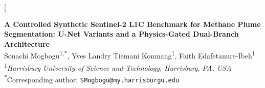 \documentclass[10pt,twocolumn]{article}
\newcommand{\papertitle}{A Controlled Synthetic Sentinel-2 L1C Benchmark for Methane Plume Segmentation: U-Net Variants and a Physics-Gated Dual-Branch Architecture}
\begin{document}
\twocolumn[
\begin{center}
{\LARGE\bfseries \papertitle}\\
\vspace{10pt}
{\large Sonachi Mogbogu\textsuperscript{1,*},\quad
Yves Landry Tiemani Komnang\textsuperscript{1},\quad
Faith Edafetanure-Ibeh\textsuperscript{1}}\\
\vspace{4pt}
\textsuperscript{1}\emph{Harrisburg University of Science and Technology, Harrisburg, PA, USA}\\
\vspace{2pt}
\textsuperscript{*}Corresponding author: \texttt{SMogbogu@my.harrisburgu.edu}
\vspace{14pt}
\end{center}

\begin{center}
\begin{minipage}{0.94\textwidth}

\end{minipage}
\end{center}
\end{document}

